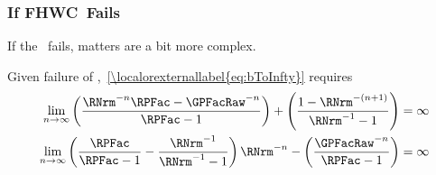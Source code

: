 \documentclass[\econtexRoot/BufferStockTheory]{subfiles}
\begin{document}

\subsubsection{If {FHWC}~Fails}
If the \FHWC~fails, matters are a bit more complex.

\begin{comment}
  As noted in the main text, the Finite Value Requirement for such a consumer
  requires $\GPFacRaw < (\Rfree/\PermGroFac)^{1/\CRRA}$,\footnote{A
    unique well-defined nondegenerate limiting consumption function can
    actually exist even if a nondegenerate value function does not.  But
    the parametric combinations required for this are somewhat peculiar
    (including both $\Rfree < 1$ and $\PermGroFac < 1$); but we restrict our attention
    to the more useful and plausible cases with finite value.} which is stronger (holds
  in strictly fewer circumstances) than the \GICRaw~condition $\GPFacRaw < 1$.
  Thus, the \GICRaw~is an implication of $\cncl{\FHWC}$.
\end{comment}

Given failure of \FHWC,~\eqref{\localorexternallabel{eq:bToInfty}} requires
\begin{equation}\begin{gathered}\begin{aligned}
  \lim_{n \rightarrow \infty} \left(\frac{\RNrm^{-n}\RPFac-\GPFacRaw^{-n}}{\RPFac-1}\right) + \left(\frac{1-\RNrm^{-(n+1)}}{\RNrm^{-1}-1}\right)  & = \infty \notag
  \\   \lim_{n \rightarrow \infty} \left(\frac{\RPFac}{\RPFac-1}-\frac{\RNrm^{-1}}{\RNrm^{-1}-1}\right)\RNrm^{-n}-\left(\frac{\GPFacRaw^{-n}}{\RPFac-1}\right)  & = \infty \label{eq:FHWCfails} 
\end{aligned}\end{gathered}\end{equation}
\hypertarget{PFGICHoldsFHWCFailsRICFailsDiscuss}{}
\end{document}
